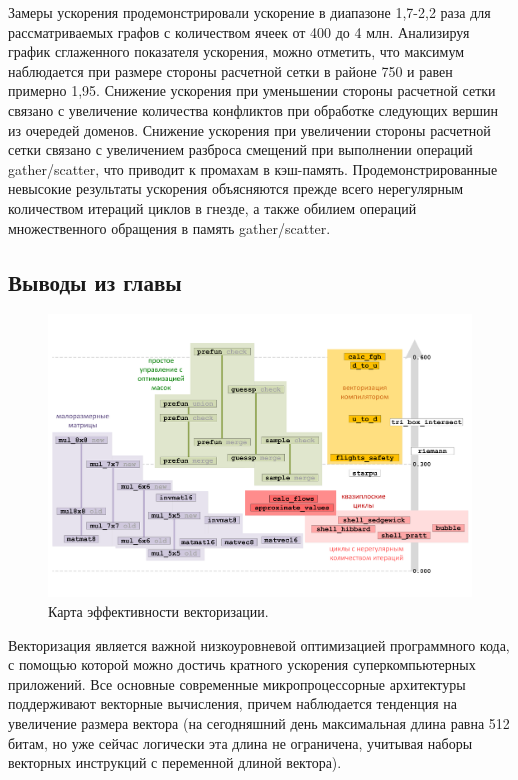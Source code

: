Замеры ускорения продемонстрировали ускорение в диапазоне 1,7-2,2 раза для рассматриваемых графов с количеством ячеек от 400 до 4 млн.
Анализируя график сглаженного показателя ускорения, можно отметить, что максимум наблюдается при размере стороны расчетной сетки в районе 750 и равен примерно 1,95.
Снижение ускорения при уменьшении стороны расчетной сетки связано с увеличение количества конфликтов при обработке следующих вершин из очередей доменов.
Снижение ускорения при увеличении стороны расчетной сетки связано с увеличением разброса смещений при выполнении операций gather/scatter, что приводит к промахам в кэш-память.
Продемонстрированные невысокие результаты ускорения объясняются прежде всего нерегулярным количеством итераций циклов в гнезде, а также обилием операций множественного обращения в память gather/scatter.


\subsection{Выводы из главы}

\begin{figure}[ht]
\centering
\includegraphics[width=1.0\textwidth]{fig/vec_map_cut.pdf}
\singlespacing
{}\caption{Карта эффективности векторизации.}
\label{fig:text_4_fin_map}
\end{figure}

Векторизация является важной низкоуровневой оптимизацией программного кода, с помощью которой можно достичь кратного ускорения суперкомпьютерных приложений.
Все основные современные микропроцессорные архитектуры поддерживают векторные вычисления, причем наблюдается тенденция на увеличение размера вектора (на сегодняшний день максимальная длина равна 512 битам, но уже сейчас логически эта длина не ограничена, учитывая наборы векторных инструкций с переменной длиной вектора).

